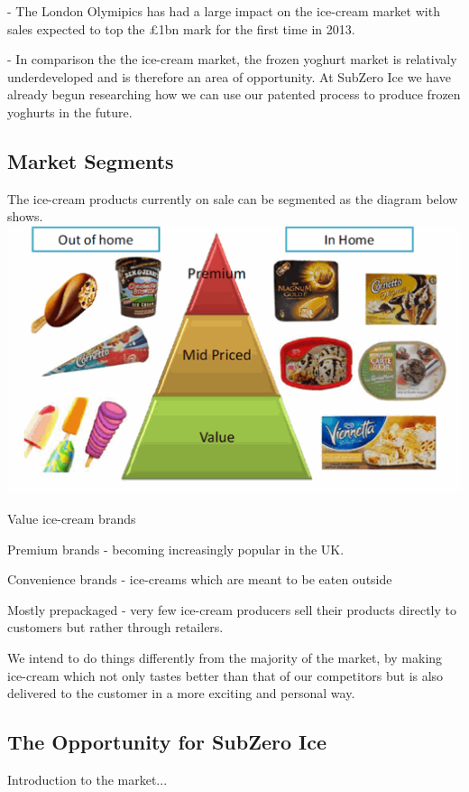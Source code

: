 \documentclass{article}
\begin{document}
- The London Olymipics has had a large impact on the ice-cream market with sales expected to top the £1bn mark for the first time in 2013.

- In comparison the the ice-cream market, the frozen yoghurt market is relativaly underdeveloped and is therefore an area of opportunity. At SubZero Ice we have already begun researching how we can use our patented process to produce frozen yoghurts in the future.


  \subsection{Market Segments}

  The ice-cream products currently on sale can be segmented as the diagram below shows.
  \includegraphics[scale=0.3]{pricepyramid.gif}

  Value ice-cream brands

  Premium brands - becoming increasingly popular in the UK.

  Convenience brands - ice-creams which are meant to be eaten outside

  Mostly prepackaged - very few ice-cream producers sell their products directly to customers but rather through retailers.

  We intend to do things differently from the majority of the market, by making ice-cream which not only tastes better than that of our competitors but is also delivered to the customer in a more exciting and personal way.


  \subsection{The Opportunity for SubZero Ice}
  Introduction to the market...
\end{document}

